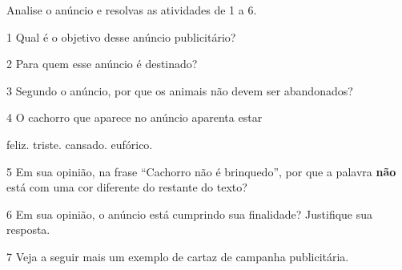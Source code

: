 
Analise o anúncio e resolvas as atividades de 1 a 6.




\num{1} Qual é o objetivo desse anúncio publicitário? 


\num{2} Para quem esse anúncio é destinado? 


\num{3} Segundo o anúncio, por que os animais não devem ser abandonados? 


\num{4} O cachorro que aparece no anúncio aparenta estar

\begin{boxlist}
   feliz.
   triste.
   cansado.
   eufórico.
\end{boxlist}

\num{5} Em sua opinião, na frase ``Cachorro não é brinquedo'', por que a palavra \textbf{não} está com uma cor diferente do restante do texto?


\num{6} Em sua opinião, o anúncio está cumprindo sua finalidade? Justifique
sua resposta. 


\num{7} Veja a seguir mais um exemplo de cartaz de campanha publicitária.



